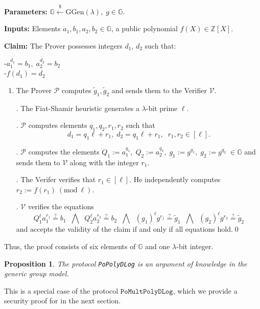 \documentclass[11pt, lettersize, notitlepage, leqno, footskip=0.6cm]{article}
\newcommand{\bz}{\mathbb Z}
\newcommand{\ttt}{\texttt}
\newcommand{\wti}{\widetilde}
\newcommand{\mc}{\mathcal}
\newcommand{\mb}{\mathbb}
\newcommand{\mr}{\mathrm}
\newcommand{\lam}{\lambda}
\newcommand{\lamb}{\lambda}
\newcommand{\vs}{\vspace{-0.15cm}}
\newcommand{\Mod}[1]{\ (\mathrm{mod}\ #1)}
\newtheorem{Prop}[Thm]{Proposition}
\numberwithin{equation}{section}
\begin{document}
\noindent \textbf{Parameters:} $\mb{G}\xleftarrow{\$} \mr{GGen}(\lamb), \; g\in \mb{G}$.

\noindent \textbf{Inputs:} Elements $a_1, b_1, a_2, b_2\in \mb{G}$, a public polynomial $f(X)\in\bz[X]$.

\noindent \textbf{Claim:} The Prover possesses integers $d_1$, $d_2$ such that:

\noindent -$a_1^{d_1} = b_1,\;  a_2^{d_2} = b_2$\\
-$f(d_1) = d_2$

\begin{enumerate}[wide, labelwidth=!, labelindent=0pt]\vs \item The Prover $\mc{P}$ computes $\wti{g}_1, \wti{g}_2$ and sends them to the Verifier $\mc{V}$.

. The Fiat-Shamir heuristic generates a $\lamb$-bit prime $\ell$.

. $\mc{P}$ computes elements $q_1, q_2, r_1, r_2$ such that \vs $$d_1 = q_1\ell+r_1,\; d_2 = q_1\ell+r_1,\;\; r_1,r_2\in [\ell].$$

. $\mc{P}$ computes the elements $Q_1:= a_1^{q_1},\;Q_2:= a_2^{q_2},\; g_1:= g^{q_1},\; g_2:= g^{q_2}\;\in\mb{G}$ and sends them to $\mc{V}$ along with the integer $r_1$.

. The Verifer verifies that $r_1\in [\ell]$. He independently computes $r_2:= f(r_1)\Mod{\ell}$.

. $\mc{V}$ verifies the equations \vs $$Q_1^{\ell}a_1^{r_1}\stackrel{?}{=} b_1\;\;\bigwedge\;\; Q_2^{\ell}a_2^{r_2}\stackrel{?}{=} b_2 \;\;\bigwedge\;\; (g_1)^{\ell}g^{r_1} \stackrel{?}{=} \wti{g}_1\;\;\bigwedge\;\; (g_2)^{\ell}g^{r_2} \stackrel{?}{=} \wti{g}_2 $$ and accepts the validity of the claim if and only if all equations hold.\qed \end{enumerate}

\noindent Thus, the proof consists of six elements of $\mb{G}$ and one $\lam$-bit integer.

\begin{Prop} The protocol \verb|PoPolyDLog| is an argument of knowledge in the generic group
model.\end{Prop}

\begin{prf} This is a special case of the protocol $\ttt{PoMultPolyDLog}$, which we provide a security proof for in the next section.\end{prf}
\end{document}
